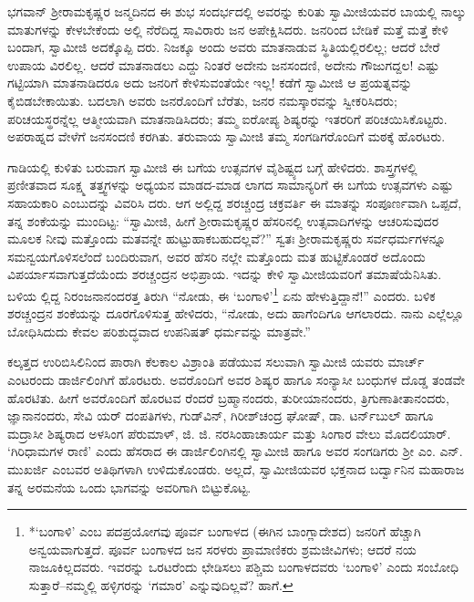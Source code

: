 ಭಗವಾನ್ ಶ್ರೀರಾಮಕೃಷ್ಣರ ಜನ್ಮದಿನದ ಈ ಶುಭ ಸಂದರ್ಭದಲ್ಲಿ ಅವರನ್ನು ಕುರಿತು ಸ್ವಾಮೀಜಿಯವರ ಬಾಯಲ್ಲಿ ನಾಲ್ಕು ಮಾತುಗಳನ್ನು ಕೇಳಬೇಕೆಂದು ಅಲ್ಲಿ ನೆರೆದಿದ್ದ ಸಾವಿರಾರು ಜನ ಅಪೇಕ್ಷಿಸಿದರು. ಜನರಿಂದ ಬೇಡಿಕೆ ಮತ್ತೆ ಮತ್ತೆ ಕೇಳಿ ಬಂದಾಗ, ಸ್ವಾಮೀಜಿ ಅದಕ್ಕೊಪ್ಪಿ ದರು. ನಿಜಕ್ಕೂ ಅಂದು ಅವರು ಮಾತನಾಡುವ ಸ್ಥಿತಿಯಲ್ಲಿರಲಿಲ್ಲ; ಆದರೆ ಬೇರೆ ಉಪಾಯ ವಿರಲಿಲ್ಲ. ಆದರೆ ಮಾತನಾಡಲು ಎದ್ದು ನಿಂತರೆ ಅದೇನು ಜನಸಂದಣಿ, ಅದೇನು ಗೌಜುಗದ್ದಲ! ಎಷ್ಟು ಗಟ್ಟಿಯಾಗಿ ಮಾತನಾಡಿದರೂ ಅದು ಜನರಿಗೆ ಕೇಳಿಸುವಂತೆಯೇ ಇಲ್ಲ! ಕಡೆಗೆ ಸ್ವಾಮೀಜಿ ಆ ಪ್ರಯತ್ನವನ್ನು ಕೈಬಿಡಬೇಕಾಯಿತು. ಬದಲಾಗಿ ಅವರು ಜನರೊಂದಿಗೆ ಬೆರೆತು, ಜನರ ನಮಸ್ಕಾರವನ್ನು ಸ್ವೀಕರಿಸಿದರು; ಪರಿಚಯಸ್ಥರನ್ನೆಲ್ಲ ಆತ್ಮೀಯವಾಗಿ ಮಾತನಾಡಿಸಿದರು; ತಮ್ಮ ಐರೋಪ್ಯ ಶಿಷ್ಯರನ್ನು ಇತರರಿಗೆ ಪರಿಚಯಿಸಿಕೊಟ್ಟರು. ಅಪರಾಹ್ನದ ವೇಳೆಗೆ ಜನಸಂದಣಿ ಕರಗಿತು. ತರುವಾಯ ಸ್ವಾಮೀಜಿ ತಮ್ಮ ಸಂಗಡಿಗರೊಂದಿಗೆ ಮಠಕ್ಕೆ ಹೊರಟರು.

ಗಾಡಿಯಲ್ಲಿ ಕುಳಿತು ಬರುವಾಗ ಸ್ವಾಮೀಜಿ ಈ ಬಗೆಯ ಉತ್ಸವಗಳ ವೈಶಿಷ್ಟ್ಯದ ಬಗ್ಗೆ ಹೇಳಿದರು. ಶಾಸ್ತ್ರಗಳಲ್ಲಿ ಪ್ರಣೀತವಾದ ಸೂಕ್ಷ್ಮ ತತ್ತ್ವಗಳನ್ನು ಅಧ್ಯಯನ ಮಾಡದ-ಮಾಡ ಲಾಗದ ಸಾಮಾನ್ಯರಿಗೆ ಈ ಬಗೆಯ ಉತ್ಸವಗಳು ಎಷ್ಟು ಸಹಾಯಕಾರಿ ಎಂಬುದನ್ನು ವಿವರಿಸಿ ದರು. ಆಗ ಅಲ್ಲಿದ್ದ ಶರಚ್ಚಂದ್ರ ಚಕ್ರವರ್ತಿ ಈ ಮಾತನ್ನು ಸಂಪೂರ್ಣವಾಗಿ ಒಪ್ಪದೆ, ತನ್ನ ಶಂಕೆಯನ್ನು ಮುಂದಿಟ್ಟ: “ಸ್ವಾಮೀಜಿ, ಹೀಗೆ ಶ್ರೀರಾಮಕೃಷ್ಣರ ಹೆಸರಿನಲ್ಲಿ ಉತ್ಸವಾದಿಗಳನ್ನು ಆಚರಿಸುವುದರ ಮೂಲಕ ನೀವು ಮತ್ತೊಂದು ಮತವನ್ನೇ ಹುಟ್ಟುಹಾಕಬಹುದಲ್ಲವೆ?” ಸ್ವತಃ ಶ್ರೀರಾಮಕೃಷ್ಣರು ಸರ್ವಧರ್ಮಗಳನ್ನೂ ಸಮನ್ವಯಗೊಳಿಸಲೆಂದೆ ಬಂದಿರುವಾಗ, ಅವರ ಹೆಸರಿ ನಲ್ಲೇ ಮತ್ತೊಂದು ಮತ ಹುಟ್ಟಿಕೊಂಡರೆ ಅದೊಂದು ವಿಪರ್ಯಾಸವಾಗುತ್ತದೆಯೆಂದು ಶರಚ್ಚಂದ್ರನ ಅಭಿಪ್ರಾಯ. ಇದನ್ನು ಕೇಳಿ ಸ್ವಾಮೀಜಿಯವರಿಗೆ ತಮಾಷೆಯೆನಿಸಿತು. ಬಳಿಯ ಲ್ಲಿದ್ದ ನಿರಂಜನಾನಂದರತ್ತ ತಿರುಗಿ “ನೋಡು, ಈ ‘ಬಂಗಾಳಿ’\footnote{*‘ಬಂಗಾಳಿ’ ಎಂಬ ಪದಪ್ರಯೋಗವು ಪೂರ್ವ ಬಂಗಾಳದ (ಈಗಿನ ಬಾಂಗ್ಲಾದೇಶದ) ಜನರಿಗೆ ಹೆಚ್ಚಾಗಿ ಅನ್ವಯವಾಗುತ್ತದೆ. ಪೂರ್ವ ಬಂಗಾಳದ ಜನ ಸರಳರು ಪ್ರಾಮಾಣಿಕರು ಶ್ರಮಜೀವಿಗಳು; ಆದರೆ ನಯ ನಾಜೂಕಿಲ್ಲದವರು. ಇವರನ್ನು ಒರಟರೆಂದು ಛೇಡಿಸಲು ಪಶ್ಚಿಮ ಬಂಗಾಳದವರು ‘ಬಂಗಾಳಿ’ ಎಂದು ಸಂಬೋಧಿ ಸುತ್ತಾರೆ–ನಮ್ಮಲ್ಲಿ ಹಳ್ಳಿಗರನ್ನು ‘ಗಮಾರ’ ಎನ್ನುವುದಿಲ್ಲವೆ? ಹಾಗೆ.} ಏನು ಹೇಳುತ್ತಿದ್ದಾನೆ!” ಎಂದರು. ಬಳಿಕ ಶರಚ್ಚಂದ್ರನ ಶಂಕೆಯನ್ನು ದೂರಗೊಳಿಸುತ್ತ ಹೇಳಿದರು, “ನೋಡು, ಅದು ಹಾಗೆಂದಿಗೂ ಆಗಲಾರದು. ನಾನು ಎಲ್ಲೆಲ್ಲೂ ಬೋಧಿಸಿದುದು ಕೇವಲ ಪರಿಶುದ್ಧವಾದ ಉಪನಿಷತ್ ಧರ್ಮವನ್ನು ಮಾತ್ರವೇ.”

ಕಲ್ಕತ್ತದ ಉರಿಬಿಸಿಲಿನಿಂದ ಪಾರಾಗಿ ಕೆಲಕಾಲ ವಿಶ್ರಾಂತಿ ಪಡೆಯುವ ಸಲುವಾಗಿ ಸ್ವಾಮೀಜಿ ಯವರು ಮಾರ್ಚ್ ಎಂಟರಂದು ಡಾರ್ಜಿಲಿಂಗಿಗೆ ಹೊರಟರು. ಅವರೊಂದಿಗೆ ಅವರ ಶಿಷ್ಯರ ಹಾಗೂ ಸಂನ್ಯಾಸೀ ಬಂಧುಗಳ ದೊಡ್ಡ ತಂಡವೇ ಹೊರಟಿತು. ಹೀಗೆ ಅವರೊಂದಿಗೆ ಹೊರಟವ ರೆಂದರೆ ಬ್ರಹ್ಮಾನಂದರು, ತುರೀಯಾನಂದರು, ತ್ರಿಗುಣಾತೀತಾನಂದರು, ಜ್ಞಾನಾನಂದರು, ಸೇವಿ ಯರ್ ದಂಪತಿಗಳು, ಗುಡ್​ವಿನ್, ಗಿರೀಶ್​ಚಂದ್ರ ಘೋಷ್, ಡಾ. ಟರ್ನ್​ಬುಲ್ ಹಾಗೂ ಮದ್ರಾಸೀ ಶಿಷ್ಯರಾದ ಅಳಸಿಂಗ ಪೆರುಮಾಳ್, ಜಿ. ಜಿ. ನರಸಿಂಹಾಚಾರ್ಯ ಮತ್ತು ಸಿಂಗಾರ ವೇಲು ಮೊದಲಿಯಾರ್. ‘ಗಿರಿಧಾಮಗಳ ರಾಣಿ’ ಎಂದು ಹೆಸರಾದ ಈ ಡಾರ್ಜಿಲಿಂಗಿನಲ್ಲಿ ಸ್ವಾಮೀಜಿ ಹಾಗೂ ಅವರ ಸಂಗಡಿಗರು ಶ್ರೀ ಎಂ. ಎನ್. ಮುಖರ್ಜಿ ಎಂಬವರ ಅತಿಥಿಗಳಾಗಿ ಉಳಿದುಕೊಂಡರು. ಅಲ್ಲದೆ, ಸ್ವಾಮೀಜಿಯವರ ಭಕ್ತನಾದ ಬರ್ದ್ವಾನಿನ ಮಹಾರಾಜ ತನ್ನ ಅರಮನೆಯ ಒಂದು ಭಾಗವನ್ನು ಅವರಿಗಾಗಿ ಬಿಟ್ಟುಕೊಟ್ಟ.

